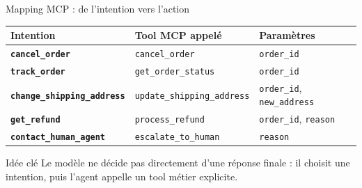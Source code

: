 \documentclass[aspectratio=169,10pt]{beamer}
\begin{document}
\begin{frame}{Mapping MCP : de l'intention vers l'action}
    \begin{table}
        \small
        \begin{tabular}{>{\bfseries}p{}p{}p{}}
            \toprule
            Intention & Tool MCP appelé & Paramètres \\
            \midrule
            \texttt{cancel\_order} & \texttt{cancel\_order} & \texttt{order\_id} \\
            \texttt{track\_order} & \texttt{get\_order\_status} & \texttt{order\_id} \\
            \texttt{change\_shipping\_address} & \texttt{update\_shipping\_address} & \texttt{order\_id}, \texttt{new\_address} \\
            \texttt{get\_refund} & \texttt{process\_refund} & \texttt{order\_id}, \texttt{reason} \\
            \texttt{contact\_human\_agent} & \texttt{escalate\_to\_human} & \texttt{reason} \\
            \bottomrule
        \end{tabular}
    \end{table}

    \begin{block}{Idée clé}
        Le modèle ne décide pas directement d'une réponse finale : il choisit une intention, puis l'agent appelle un tool métier explicite.
    \end{block}
\end{frame}
\end{document}
